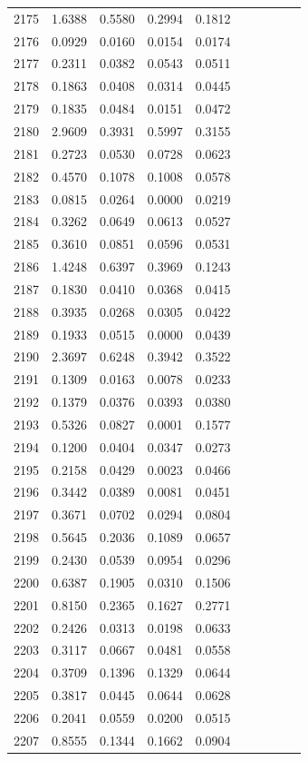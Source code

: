 \begin{table}
\begin{tabular}{cccccccccc}
2175& 1.6388& 0.5580& 0.2994& 0.1812\\ 
2176& 0.0929& 0.0160& 0.0154& 0.0174\\ 
2177& 0.2311& 0.0382& 0.0543& 0.0511\\ 
2178& 0.1863& 0.0408& 0.0314& 0.0445\\ 
2179& 0.1835& 0.0484& 0.0151& 0.0472\\ 
2180& 2.9609& 0.3931& 0.5997& 0.3155\\ 
2181& 0.2723& 0.0530& 0.0728& 0.0623\\ 
2182& 0.4570& 0.1078& 0.1008& 0.0578\\ 
2183& 0.0815& 0.0264& 0.0000& 0.0219\\ 
2184& 0.3262& 0.0649& 0.0613& 0.0527\\ 
2185& 0.3610& 0.0851& 0.0596& 0.0531\\ 
2186& 1.4248& 0.6397& 0.3969& 0.1243\\ 
2187& 0.1830& 0.0410& 0.0368& 0.0415\\ 
2188& 0.3935& 0.0268& 0.0305& 0.0422\\ 
2189& 0.1933& 0.0515& 0.0000& 0.0439\\ 
2190& 2.3697& 0.6248& 0.3942& 0.3522\\ 
2191& 0.1309& 0.0163& 0.0078& 0.0233\\ 
2192& 0.1379& 0.0376& 0.0393& 0.0380\\ 
2193& 0.5326& 0.0827& 0.0001& 0.1577\\ 
2194& 0.1200& 0.0404& 0.0347& 0.0273\\ 
2195& 0.2158& 0.0429& 0.0023& 0.0466\\ 
2196& 0.3442& 0.0389& 0.0081& 0.0451\\ 
2197& 0.3671& 0.0702& 0.0294& 0.0804\\ 
2198& 0.5645& 0.2036& 0.1089& 0.0657\\ 
2199& 0.2430& 0.0539& 0.0954& 0.0296\\ 
2200& 0.6387& 0.1905& 0.0310& 0.1506\\ 
2201& 0.8150& 0.2365& 0.1627& 0.2771\\ 
2202& 0.2426& 0.0313& 0.0198& 0.0633\\ 
2203& 0.3117& 0.0667& 0.0481& 0.0558\\ 
2204& 0.3709& 0.1396& 0.1329& 0.0644\\ 
2205& 0.3817& 0.0445& 0.0644& 0.0628\\ 
2206& 0.2041& 0.0559& 0.0200& 0.0515\\ 
2207& 0.8555& 0.1344& 0.1662& 0.0904\\ 

\end{tabular}
\end{table}
